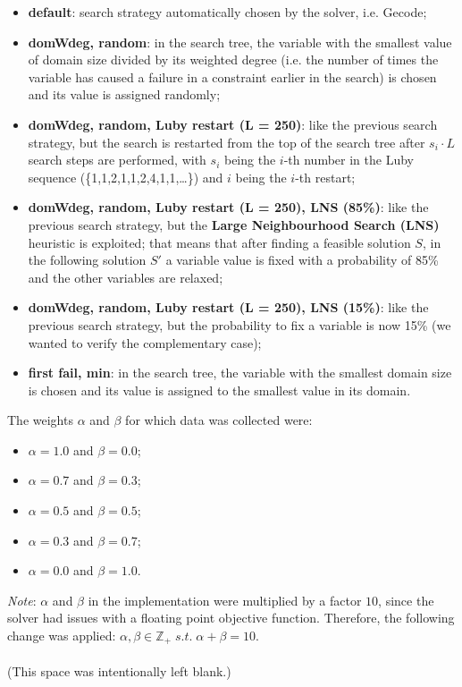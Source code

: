 \documentclass[../main.tex]{subfiles}
\begin{document}
\begin{itemize}
    \item \textbf{default}: search strategy automatically chosen by the solver, i.e. Gecode;
    \item \textbf{domWdeg, random}: in the search tree, the variable with the smallest value of domain size divided by its weighted degree (i.e. the number of times the variable has caused a failure in a constraint earlier in the search) is chosen and its value is assigned randomly;
    \item \textbf{domWdeg, random, Luby restart (L = 250)}: like the previous search strategy, but the search is restarted from the top of the search tree after $s_i \cdot L$ search steps are performed, with $s_i$ being the $i$-th number in the Luby sequence (\{1,1,2,1,1,2,4,1,1,\dots\}) and $i$ being the $i$-th restart;
    \item \textbf{domWdeg, random, Luby restart (L = 250), LNS (85\%)}: like the previous search strategy, but the \textbf{Large Neighbourhood Search (LNS)} heuristic is exploited; that means that after finding a feasible solution $S$, in the following solution $S'$ a variable value is fixed with a probability of 85\% and the other variables are relaxed;
    \item \textbf{domWdeg, random, Luby restart (L = 250), LNS (15\%)}: like the previous search strategy, but the probability to fix a variable is now 15\% (we wanted to verify the complementary case);
    \item \textbf{first fail, min}: in the search tree, the variable with the smallest domain size is chosen and its value is assigned to the smallest value in its domain.
\end{itemize}
The weights $\alpha$ and $\beta$ for which data was collected were:
\begin{itemize}
    \item $\alpha = 1.0$ and $\beta = 0.0$;
    \item $\alpha = 0.7$ and $\beta = 0.3$;
    \item $\alpha = 0.5$ and $\beta = 0.5$;
    \item $\alpha = 0.3$ and $\beta = 0.7$;
    \item $\alpha = 0.0$ and $\beta = 1.0$.
\end{itemize}
\textit{Note}: $\alpha$ and $\beta$ in the implementation were multiplied by a factor $10$, since the solver had issues with a floating point objective function. Therefore, the following change was applied: $\alpha, \beta \in \mathbb{Z}_+ \; s.t.\; \alpha + \beta = 10$.
\\
\\
(This space was intentionally left blank.)
\newpage














\end{document}
